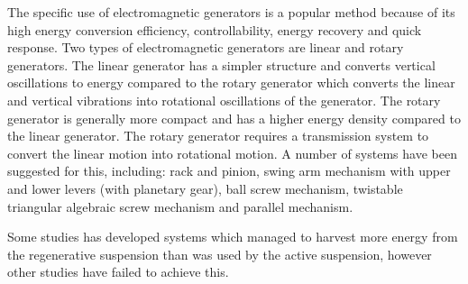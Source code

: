 The specific use of electromagnetic generators is a popular method because of its high energy conversion efficiency, controllability, energy recovery and quick response\:\cite{abdelkareemVibrationEnergyHarvesting2018}. Two types of electromagnetic generators are linear and rotary generators\:\cite{liuTransmissionEnergyharvestingStudy2021}\cite{abdelkareemVibrationEnergyHarvesting2018}. The linear generator has a simpler structure and converts vertical oscillations to energy compared to the rotary generator which converts the linear and vertical vibrations into rotational oscillations of the generator\:\cite{abdelkareemVibrationEnergyHarvesting2018}. The rotary generator is generally more compact and has a higher energy density compared to the linear generator\:\cite{liuTransmissionEnergyharvestingStudy2021}\cite{abdelkareemVibrationEnergyHarvesting2018}. The rotary generator requires a transmission system to convert the linear motion into rotational motion\:\cite{liuTransmissionEnergyharvestingStudy2021}. A number of systems have been suggested for this, including: rack and pinion, swing arm mechanism with upper and lower levers (with planetary gear), ball screw mechanism, twistable triangular algebraic screw mechanism and parallel mechanism\:\cite{liuTransmissionEnergyharvestingStudy2021}.

Some studies\:\cite{azmiNovelOptimalControl2023} has developed systems which managed to harvest more energy from the regenerative suspension than was used by the active suspension, however other studies have failed to achieve this\:\cite{liuTransmissionEnergyharvestingStudy2021}.

